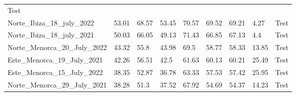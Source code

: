 \begin{table}[H]
{\begin{tabular}{lllllllll}
            {\color[HTML]{fc8d62} Test}
            \\
            Norte\_Ibiza\_18\_july\_2022           & 53.01               &
            68.57
                                                   & 53.45               &
            70.57
                                                   & 69.52               &
            69.21
                                                   & 4.27                &
            {\color[HTML]{fc8d62} Test}
            \\
            Norte\_Ibiza\_18\_july\_2021           & 50.03               &
            66.05
                                                   & 49.13               &
            71.43
                                                   & 66.85               &
            67.13
                                                   & 4.4                 &
            {\color[HTML]{fc8d62} Test}
            \\
            Norte\_Menorca\_20\_July\_2022         & 43.32               & 55.8
                                                   & 43.98               & 69.5
                                                   & 58.77               &
            58.33
                                                   & 13.85               &
            {\color[HTML]{fc8d62} Test}
            \\
            Este\_Menorca\_19\_July\_2021          & 42.26               &
            56.51
                                                   & 42.5                &
            61.63
                                                   & 60.13               &
            60.21
                                                   & 25.49               &
            {\color[HTML]{fc8d62} Test}
            \\
            Este\_Menorca\_15\_July\_2022          & 38.35               &
            52.87
                                                   & 36.78               &
            63.33
                                                   & 57.53               &
            57.42
                                                   & 25.95               &
            {\color[HTML]{fc8d62} Test}
            \\
            Norte\_Menorca\_29\_July\_2021         & 38.28               & 51.3
                                                   & 37.52               &
            67.92
                                                   & 54.69               &
            54.37
                                                   & 14.23               &
            {\color[HTML]{fc8d62} Test}
            \\ \bottomrule
        \end{tabular}%
    }
\end{table}

